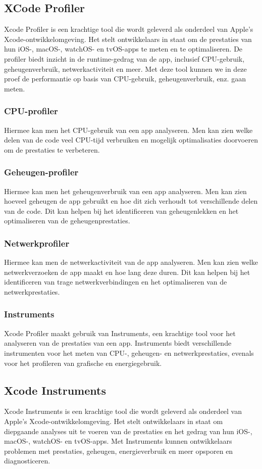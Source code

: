 \subsection{XCode Profiler}
Xcode Profiler is een krachtige tool die wordt geleverd als onderdeel van Apple's Xcode-ontwikkelomgeving. Het stelt ontwikkelaars in staat om de prestaties van hun iOS-, macOS-, watchOS- en tvOS-apps te meten en te optimaliseren. De profiler biedt inzicht in de runtime-gedrag van de app, inclusief CPU-gebruik, geheugenverbruik, netwerkactiviteit en meer. Met deze tool kunnen we in deze proef de performantie op basis van CPU-gebruik, geheugenverbruik, enz. gaan meten. 
\subsubsection{CPU-profiler}
Hiermee kan men het CPU-gebruik van een app analyseren. Men kan zien welke delen van de code veel CPU-tijd verbruiken en mogelijk optimalisaties doorvoeren om de prestaties te verbeteren.
\subsubsection{Geheugen-profiler}
Hiermee kan men het geheugenverbruik van een app analyseren. Men kan zien hoeveel geheugen de app gebruikt en hoe dit zich verhoudt tot verschillende delen van de code. Dit kan helpen bij het identificeren van geheugenlekken en het optimaliseren van de geheugenprestaties.
\subsubsection{Netwerkprofiler}
Hiermee kan men de netwerkactiviteit van de app analyseren. Men kan zien welke netwerkverzoeken de app maakt en hoe lang deze duren. Dit kan helpen bij het identificeren van trage netwerkverbindingen en het optimaliseren van de netwerkprestaties.
\subsubsection{Instruments}
Xcode Profiler maakt gebruik van Instruments, een krachtige tool voor het analyseren van de prestaties van een app. Instruments biedt verschillende instrumenten voor het meten van CPU-, geheugen- en netwerkprestaties, evenals voor het profileren van grafische en energiegebruik.


\subsection{Xcode Instruments}
Xcode Instruments is een krachtige tool die wordt geleverd als onderdeel van Apple's Xcode-ontwikkelomgeving. Het stelt ontwikkelaars in staat om diepgaande analyses uit te voeren van de prestaties en het gedrag van hun iOS-, macOS-, watchOS- en tvOS-apps. Met Instruments kunnen ontwikkelaars problemen met prestaties, geheugen, energieverbruik en meer opsporen en diagnosticeren. 

